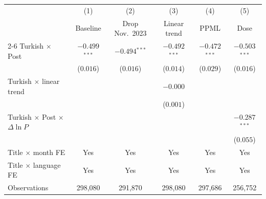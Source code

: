 \begin{tabular}{lccccc}
\toprule
 & (1) & (2) & (3) & (4) & (5) \\
 & Baseline & Drop Nov.\ 2023 & Linear trend & PPML & Dose \\
\cmidrule(lr){2-6}
Turkish $\times$ Post & $-0.499$$^{***}$ & $-0.494$$^{***}$ & $-0.492$$^{***}$ & $-0.472$$^{***}$ & $-0.503$$^{***}$ \\
 & ($0.016$) & ($0.016$) & ($0.014$) & ($0.029$) & ($0.016$) \\[3pt]
Turkish $\times$ linear trend &  &  & $-0.000$ &  &  \\
 &  &  & ($0.001$) &  &  \\[3pt]
Turkish $\times$ Post $\times$ $\Delta\ln P$ &  &  &  &  & $-0.287$$^{***}$ \\
 &  &  &  &  & ($0.055$) \\[3pt]
\midrule
Title $\times$ month FE & Yes & Yes & Yes & Yes & Yes \\
Title $\times$ language FE & Yes & Yes & Yes & Yes & Yes \\
Observations & 298,080 & 291,870 & 298,080 & 297,686 & 256,752 \\
\bottomrule
\end{tabular}

